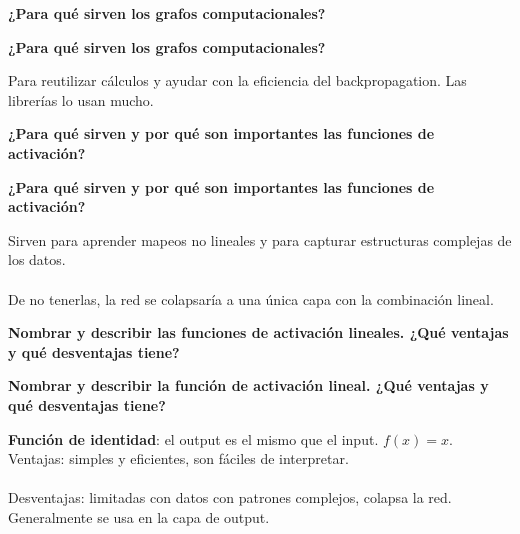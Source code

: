 \documentclass[10pt]{memoir}
\begin{document}
\clearpage
\begin{center}
	\textbf{\Large ¿Para qué sirven los grafos computacionales?} \\
\end{center}

\clearpage
\begin{center}
	\textbf{\Large ¿Para qué sirven los grafos computacionales?} \\
\end{center}
\noindent Para reutilizar cálculos y ayudar con la eficiencia del backpropagation. Las librerías lo usan mucho.


\clearpage
\begin{center}
	\textbf{\Large ¿Para qué sirven y por qué son importantes las funciones de activación?} \\
\end{center}

\clearpage
\begin{center}
	\textbf{\Large ¿Para qué sirven y por qué son importantes las funciones de activación?} \\
\end{center}
\noindent Sirven para aprender mapeos no lineales y para capturar estructuras complejas de los datos. \\
\\
\noindent De no tenerlas, la red se colapsaría a una única capa con la combinación lineal.

\clearpage
\begin{center}
	\textbf{\Large Nombrar y describir las funciones de activación lineales. ¿Qué ventajas y qué desventajas tiene?} \\
\end{center}

\clearpage
\begin{center}
	\textbf{\Large Nombrar y describir la función de activación lineal. ¿Qué ventajas y qué desventajas tiene?} \\
\end{center}
\noindent \textbf{Función de identidad}: el output es el mismo que el input. \(f(x) = x\). \\
Ventajas: simples y eficientes, son fáciles de interpretar. \\
\\
\noindent Desventajas: limitadas con datos con patrones complejos, colapsa la red. Generalmente se usa en la capa de output.
\end{document}
